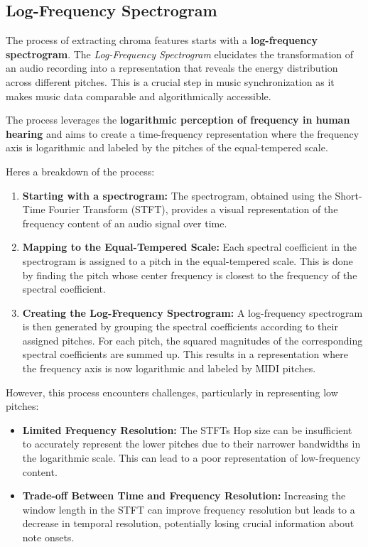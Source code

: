 \documentclass[a4paper, 9pt, twocolumn]{extarticle}
\begin{document}
\subsection{Log-Frequency Spectrogram}
The process of extracting chroma features starts with a
\textbf{log-frequency spectrogram}. The \emph{Log-Frequency Spectrogram}
elucidates the transformation of an audio recording into a
representation that reveals the energy distribution across different
pitches. This is a crucial step in music synchronization as it makes
music data comparable and algorithmically accessible.

The process leverages the \textbf{logarithmic perception of frequency in
  human hearing} and aims to create a time-frequency representation where
the frequency axis is logarithmic and labeled by the pitches of the
equal-tempered scale.

Here\textquotesingle s a breakdown of the process:

\begin{enumerate}
  \def\labelenumi{\arabic{enumi}.}
  \item
        \textbf{Starting with a spectrogram:} The spectrogram, obtained using
        the Short-Time Fourier Transform (STFT), provides a visual
        representation of the frequency content of an audio signal over time.
  \item
        \textbf{Mapping to the Equal-Tempered Scale:} Each spectral
        coefficient in the spectrogram is assigned to a pitch in the
        equal-tempered scale. This is done by finding the pitch whose center
        frequency is closest to the frequency of the spectral coefficient.
  \item
        \textbf{Creating the Log-Frequency Spectrogram:} A log-frequency
        spectrogram is then generated by grouping the spectral coefficients
        according to their assigned pitches. For each pitch, the squared
        magnitudes of the corresponding spectral coefficients are summed up.
        This results in a representation where the frequency axis is now
        logarithmic and labeled by MIDI pitches.
\end{enumerate}

However, this process encounters challenges, particularly in
representing low pitches:

\begin{itemize}
  \item
        \textbf{Limited Frequency Resolution:} The STFT\textquotesingle s
        Hop size can be insufficient to accurately represent
        the lower pitches due to their narrower bandwidths in the logarithmic
        scale. This can lead to a poor representation of low-frequency
        content.
  \item
        \textbf{Trade-off Between Time and Frequency Resolution:} Increasing
        the window length in the STFT can improve frequency resolution but
        leads to a decrease in temporal resolution, potentially losing crucial
        information about note onsets.
\end{itemize}
\end{document}

